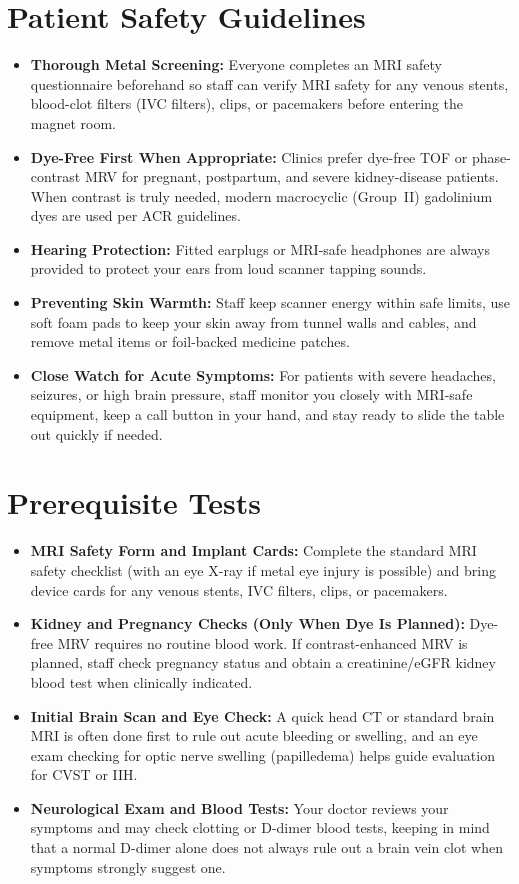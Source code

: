 \section{Patient Safety Guidelines}
\begin{itemize}
\item \textbf{Thorough Metal Screening:} Everyone completes an MRI safety questionnaire beforehand so staff can verify MRI safety for any venous stents, blood-clot filters (IVC filters), clips, or pacemakers before entering the magnet room.
\item \textbf{Dye-Free First When Appropriate:} Clinics prefer dye-free TOF or phase-contrast MRV for pregnant, postpartum, and severe kidney-disease patients. When contrast is truly needed, modern macrocyclic (Group~II) gadolinium dyes are used per ACR guidelines.
\item \textbf{Hearing Protection:} Fitted earplugs or MRI-safe headphones are always provided to protect your ears from loud scanner tapping sounds.
\item \textbf{Preventing Skin Warmth:} Staff keep scanner energy within safe limits, use soft foam pads to keep your skin away from tunnel walls and cables, and remove metal items or foil-backed medicine patches.
\item \textbf{Close Watch for Acute Symptoms:} For patients with severe headaches, seizures, or high brain pressure, staff monitor you closely with MRI-safe equipment, keep a call button in your hand, and stay ready to slide the table out quickly if needed.
\end{itemize}

\section{Prerequisite Tests}
\begin{itemize}
\item \textbf{MRI Safety Form and Implant Cards:} Complete the standard MRI safety checklist (with an eye X-ray if metal eye injury is possible) and bring device cards for any venous stents, IVC filters, clips, or pacemakers.
\item \textbf{Kidney and Pregnancy Checks (Only When Dye Is Planned):} Dye-free MRV requires no routine blood work. If contrast-enhanced MRV is planned, staff check pregnancy status and obtain a creatinine/eGFR kidney blood test when clinically indicated.
\item \textbf{Initial Brain Scan and Eye Check:} A quick head CT or standard brain MRI is often done first to rule out acute bleeding or swelling, and an eye exam checking for optic nerve swelling (papilledema) helps guide evaluation for CVST or IIH.
\item \textbf{Neurological Exam and Blood Tests:} Your doctor reviews your symptoms and may check clotting or D-dimer blood tests, keeping in mind that a normal D-dimer alone does not always rule out a brain vein clot when symptoms strongly suggest one.
\end{itemize}

